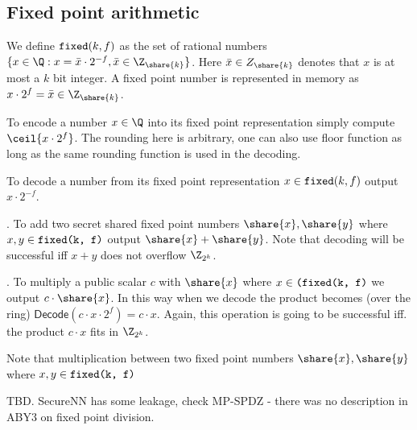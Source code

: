 \subsection{Fixed point arithmetic}
\label{subsec:fixed-point}

We define $\verb|fixed|(k, f)$ as the set of rational numbers $\{x \in
\Q : x = \bar{x} \cdot 2^{-f}, \bar{x} \in \Z_{\share{k}}\}$. Here $\bar{x}
\in Z_{\share{k}}$ denotes that $x$ is at most a $k$ bit integer. A fixed point number
is represented in memory as $x \cdot 2^{f} = \bar{x} \in \Z_{\share{k}}$.

 To encode a number $x \in \Q$ into its fixed
point representation simply compute $\ceil{x \cdot 2^f}$. The rounding here
is arbitrary, one can also use floor function as long as the same rounding
function is used in the decoding.

 To decode a number from its fixed point representation
$x \in \verb|fixed|(k, f)$ output $x \cdot 2^{-f}$.

. To add two secret shared fixed point numbers
$\share{x}, \share{y}$ where $x,y \in \verb|fixed(k, f)|$ output
$\share{x}+\share{y}$. Note that decoding will be successful iff $x+y$ does
not overflow $\Z_{2^k}$.

. To multiply a public scalar
$c$ with $\share{x}$ where $x \in \verb|(fixed(k, f)|$ we output
$c \cdot \share{x}$. In this way when we decode the product becomes (over the ring)
$\mathsf{Decode}(c \cdot x \cdot 2^f) = c \cdot x$. Again, this operation is going to
be successful iff. the product $c \cdot x$ fits in $\Z_{2^k}$.

 Note that multiplication between two
fixed point numbers $\share{x}, \share{y}$ where $x,y \in \verb|fixed(k, f)|$



TBD. SecureNN has some leakage, check MP-SPDZ - there was no description in
ABY3 on fixed point division.

